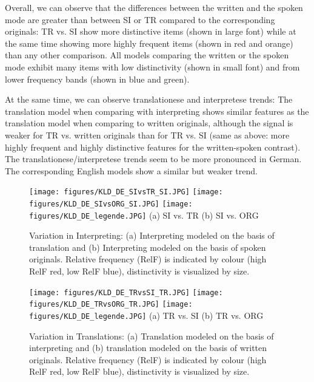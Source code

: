 \documentclass[output=paper,colorlinks,citecolor=brown]{langscibook}
\begin{document}
Overall, we can observe that the differences between the written and the spoken mode are greater than between SI or TR compared to the corresponding originals: TR vs. SI show more distinctive items (shown in large font) while at the same time showing more highly frequent items (shown in red and orange) than any other comparison. All models comparing the written or the spoken mode exhibit many items with low distinctivity (shown in small font) and from lower frequency bands (shown in blue and green).

At the same time, we can observe translationese and interpretese trends: The translation model when comparing with interpreting shows similar features as the translation model when comparing to written originals, although the signal is weaker for TR vs. written originals than for TR vs. SI (same as above: more highly frequent and highly distinctive features for the written-spoken contrast). The translationese/interpretese trends seem to be more pronounced in German. The corresponding English models show a similar but weaker trend.

\begin{figure}
\texttt{[image: figures/KLD\_DE\_SIvsTR\_SI.JPG]}
\texttt{[image: figures/KLD\_DE\_SIvsORG\_SI.JPG]}
\texttt{[image: figures/KLD\_DE\_legende.JPG]}
(a) SI vs. TR \hspace{2cm} (b) SI vs. ORG
\caption{\label{fig: DE SI vs TR and ORG} Variation in Interpreting: (a) Interpreting modeled on the basis of translation and (b) Interpreting modeled on the basis of spoken originals. Relative frequency (RelF) is indicated by colour (high RelF red, low RelF blue), distinctivity is visualized by size.}
\end{figure}

\begin{figure}[!ht]
\centering
\texttt{[image: figures/KLD\_DE\_TRvsSI\_TR.JPG]}
\texttt{[image: figures/KLD\_DE\_TRvsORG\_TR.JPG]}
\texttt{[image: figures/KLD\_DE\_legende.JPG]}
(a) TR vs. SI \hspace{2cm} (b) TR vs. ORG
\caption{\label{fig: DE TR vs SI and ORG} Variation in Translations: (a) Translation modeled on the basis of interpreting and (b) translation modeled on the basis of written originals. Relative frequency (RelF) is indicated by colour (high RelF red, low RelF blue), distinctivity is visualized by size.}
\end{figure}
\end{document}
